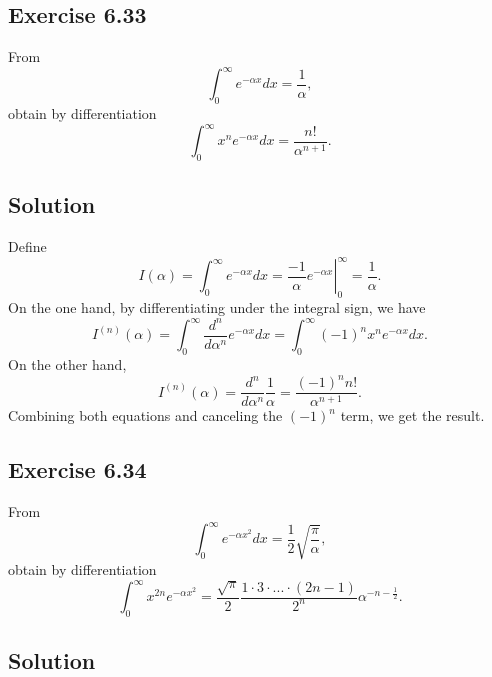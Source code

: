 \subsection*{Exercise 6.33}

From
\begin{equation*}
    \int_0^{\infty} e^{-\alpha x} dx = \frac{1}{\alpha},
\end{equation*}
obtain by differentiation
\begin{equation*}
    \int_0^{\infty} x^n e^{-\alpha x} dx = \frac{n!}{\alpha^{n+1}}.
\end{equation*}

\subsection*{Solution}

Define
\begin{equation*}
    I(\alpha) = \int_0^{\infty} e^{-\alpha x} dx
        = \left. \frac{-1}{\alpha} e^{-\alpha x} \right|_0^{\infty}
        = \frac{1}{\alpha}.
\end{equation*}
On the one hand, by differentiating under the integral sign, we have
\begin{equation*}
    I^{(n)}(\alpha)
        = \int_0^{\infty} \frac{d^n}{d\alpha^n} e^{-\alpha x} dx
        = \int_0^{\infty} (-1)^n x^n e^{-\alpha x} dx.
\end{equation*}
On the other hand,
\begin{equation*}
    I^{(n)}(\alpha)
        = \frac{d^n}{d\alpha^n} \frac{1}{\alpha}
        = \frac{(-1)^n n!}{\alpha^{n+1}}.
\end{equation*}
Combining both equations and canceling the $(-1)^n$ term, we get the result.


\subsection*{Exercise 6.34}

From
\begin{equation*}
    \int_0^{\infty} e^{-\alpha x^2} dx = \frac{1}{2} \sqrt{\frac{\pi}{\alpha}},
\end{equation*}
obtain by differentiation
\begin{equation*}
    \int_0^{\infty} x^{2n} e^{-\alpha x^2} = \frac{\sqrt{\pi}}{2} \frac{1 \cdot 3 \cdot ... \cdot (2n - 1)}{2^n} \alpha^{-n - \frac{1}{2}}.
\end{equation*}

\subsection*{Solution}

